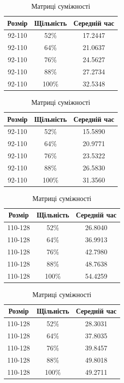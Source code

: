 \documentclass[titlepage, a4paper]{article}
\begin{document}
\begin{table}[htbp]
\begin{minipage}[b]{0.51\linewidth}
\begin{tabular}{|c|c|c|}
\hline
Розмір & Щільність & Середній час\\
\hline
92-110 & 52\% & 17.2447 \\
92-110 & 64\% & 21.0637 \\
92-110 & 76\% & 24.5627 \\
92-110 & 88\% & 27.2734 \\
92-110 & 100\% & 32.5348 \\
\hline
\end{tabular}
\caption{Списки суміжності}
\end{minipage}
\begin{minipage}[b]{0.51\linewidth}
\begin{tabular}{|c|c|c|}
\hline
Розмір & Щільність & Середній час\\
\hline
92-110 & 52\% & 15.5890 \\
92-110 & 64\% & 20.9771 \\
92-110 & 76\% & 23.5322 \\
92-110 & 88\% & 26.5830 \\
92-110 & 100\% & 31.3560 \\
\hline
\end{tabular}
\caption{Матриці суміжності}
\end{minipage}
\end{table}
\begin{table}[htbp]
\begin{minipage}[b]{0.51\linewidth}
\begin{tabular}{|c|c|c|}
\hline
Розмір & Щільність & Середній час\\
\hline
110-128 & 52\% & 26.8040 \\
110-128 & 64\% & 36.9913 \\
110-128 & 76\% & 42.7980 \\
110-128 & 88\% & 48.7638 \\
110-128 & 100\% & 54.4259 \\
\hline
\end{tabular}
\caption{Списки суміжності}
\end{minipage}
\begin{minipage}[b]{0.51\linewidth}
\begin{tabular}{|c|c|c|}
\hline
Розмір & Щільність & Середній час\\
\hline
110-128 & 52\% & 28.3031 \\
110-128 & 64\% & 37.8035 \\
110-128 & 76\% & 39.8457 \\
110-128 & 88\% & 49.8018 \\
110-128 & 100\% & 49.2711 \\
\hline
\end{tabular}
\caption{Матриці суміжності}
\end{minipage}
\end{table}
\end{document}

